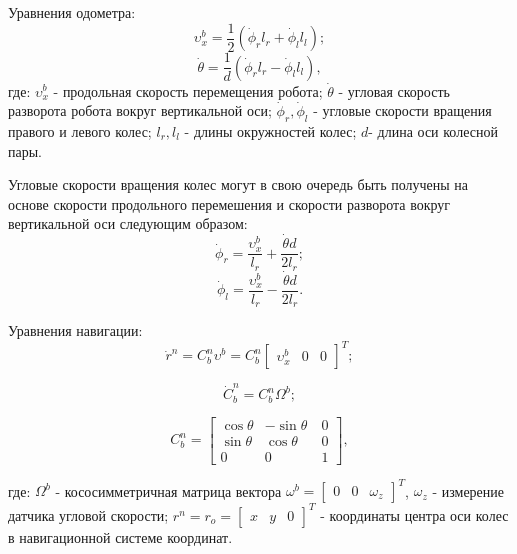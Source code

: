 \documentclass[14pt]{article}
\begin{document}
Уравнения одометра:
\begin{equation}
\upsilon_x^b = \frac{1}{2}(\dot{\phi}_r l_r+\dot{\phi}_l l_l);
\end{equation}
\begin{equation}
\dot\theta = \frac{1}{d}(\dot{\phi}_r l_r-\dot{\phi}_l l_l),
\end{equation}
где: $\upsilon_x^b$ - продольная скорость перемещения робота;  $\dot\theta$ - угловая скорость разворота робота вокруг вертикальной оси;  $\dot{\phi}_r,\dot{\phi}_l$ - угловые скорости вращения правого и левого колес; $l_r, l_l$ - длины окружностей колес; $d$- длина оси колесной пары.

Угловые скорости вращения колес могут в свою очередь быть получены на основе скорости продольного перемешения и скорости разворота вокруг вертикальной оси следующим образом:
\begin{equation}
\dot{\phi}_r = \frac{\upsilon_x^b}{l_r}+\frac{\dot\theta d}{2 l_r};
\end{equation}
\begin{equation}
\dot{\phi}_l = \frac{\upsilon_x^b}{l_r}-\frac{\dot\theta d}{2 l_r}.
\end{equation}

Уравнения навигации:
\begin{equation}
\dot{r}^n=C_b^n\upsilon^b=C_b^n \begin{bmatrix}\upsilon_x^b & 0 & 0 \end{bmatrix}^T;
\end{equation}
 
\begin{equation}
\dot{C}_b^n = C_b^n\Omega^b;
\end{equation}

\begin{equation}
C_b^n = \begin{bmatrix}\cos\theta & -\sin\theta\ & 0 \\ \sin\theta & \cos\theta & 0 \\ 0 & 0 &1 \end{bmatrix},
\end{equation}

где: $\Omega^b$ - кососимметричная матрица вектора $\omega^b=\begin{bmatrix}0 & 0 & \omega_z\end{bmatrix}^T$, $\omega_z$ - измерение датчика угловой скорости;  $r^n = r_o= \begin{bmatrix}x&y&0\end{bmatrix}^T$ - координаты центра оси колес в навигационной системе координат.
\end{document}
